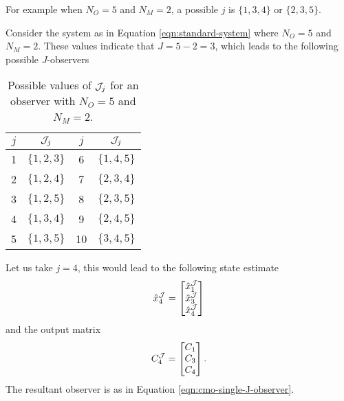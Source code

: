 For example when $N_O=5$ and $N_M=2$, a possible $j$ is $\{1,3,4\}$ or $\{2,3,5\}$. 
\begin{example}
    Consider the system as in Equation \eqref{eqn:standard-system} where $N_O=5$ and $N_M=2$. These values indicate that $J=5-2=3$, which leads to the following possible $J$-observers 
    \begin{table}[H]
        \centering
        \begin{tabular}{|c|c||c|c|}
            \toprule
            $j$ & $\mathcal{J}_j$ & $j$ & $\mathcal{J}_j$ \\
            \midrule
            1 & $\{1,2,3\}$ & 6 & $\{1,4,5\}$ \\
            2 & $\{1,2,4\}$ & 7 & $\{2,3,4\}$ \\
            3 & $\{1,2,5\}$ & 8 & $\{2,3,5\}$ \\
            4 & $\{1,3,4\}$ & 9 & $\{2,4,5\}$ \\
            5 & $\{1,3,5\}$ & 10 & $\{3,4,5\}$ \\   
            \bottomrule
        \end{tabular}
        \caption{Possible values of $\mathcal{J}_j$ for an observer with $N_O=5$ and $N_M=2$.}
        \label{tab:my_label}
    \end{table}
    Let us take $j=4$, this would lead to the following state estimate
    \begin{equation*}
        \hat{x}^{\mathcal{J}}_{4} =
        \begin{bmatrix}
            \hat{x}^{\mathcal{J}}_{1} \\
            \hat{x}^{\mathcal{J}}_{3} \\
            \hat{x}^{\mathcal{J}}_{4} \\
        \end{bmatrix}
    \end{equation*}
    and the output matrix
    \begin{equation*}
        C^{\mathcal{J}}_{4} = 
        \begin{bmatrix}
            C_1 \\ C_3 \\ C_4 \\
        \end{bmatrix}.
    \end{equation*}
    The resultant observer is as in Equation \eqref{eqn:cmo-single-J-observer}.
\end{example}

